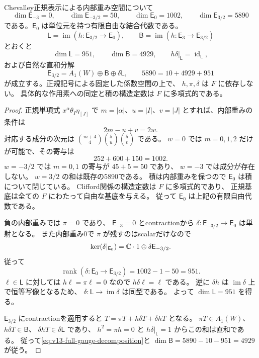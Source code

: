 \begin{lemma}
\label{lem:v13-gauge-weight-spaces}
Chevalley正規表示による内部重み空間について
\[
 \dim\mathsf E_{-3}=0,\qquad
 \dim\mathsf E_{-3/2}=50,\qquad
 \dim\mathsf E_0=1002,\qquad
 \dim\mathsf E_{3/2}=5890
\]
である。$\mathsf E_0$ は単位元を持つ有限自由な結合代数である。
\[
 \mathsf L=\operatorname{im}
       (h:\mathsf E_{3/2}\longrightarrow\mathsf E_0),\qquad
 \mathsf B=\operatorname{im}
       (h:\mathsf E_3\longrightarrow\mathsf E_{3/2})
\]
とおくと
\[
 \dim\mathsf L=951,\qquad \dim\mathsf B=4929,
 \qquad h\delta|_{\mathsf L}=\operatorname{id}_{\mathsf L},
\]
および自然な直和分解
\begin{equation}\label{eq:v13-full-gauge-decomposition}
 \mathsf E_{3/2}
 =A_1(W)\oplus\mathsf B\oplus\delta\mathsf L,
 \qquad 5890=10+4929+951
\end{equation}
が成立する。正規記号による固定した係数空間の上で、
$h,\pi,\delta$ は $F$ に依存しない。
具体的な作用素への同定と積の構造定数は $F$ に多項式的である。
\end{lemma}
\begin{proof}
正規単項式 $x^\alpha\theta_I\eta_{[J]}$ で
$m=|\alpha|$、$u=|I|$、$v=|J|$ とすれば、内部重みの条件は
\[
 2m-u+v=2w.
\]
対応する成分の次元は
$\binom{m+4}{4}\binom5u\binom5v$ である。
$w=0$ では $m=0,1,2$ だけが可能で、その寄与は
\[
 252+600+150=1002.
\]
$w=-3/2$ では $m=0,1$ の寄与が $45+5=50$ であり、
$w=-3$ では成分が存在しない。
$w=3/2$ の和は既存の5890である。
積は内部重みを保つので $\mathsf E_0$ は積について閉じている。
Clifford関係の構造定数は $F$ に多項式的であり、
正規基底は全ての $F$ にわたって自由な基底を与える。
従って $\mathsf E_0$ は上記の有限自由代数である。

負の内部重みでは $\pi=0$ であり、
$\mathsf E_{-3}=0$ とcontractionから
$\delta:\mathsf E_{-3/2}\to\mathsf E_0$ は単射となる。
また内部重み0で $\pi$ が残すのはscalarだけなので
\[
 \ker(\delta|_{\mathsf E_0})
 =\mathbb C\cdot1\oplus\delta\mathsf E_{-3/2}.
\]
従って
\[
 \operatorname{rank}(\delta:\mathsf E_0\to\mathsf E_{3/2})
 =1002-1-50=951.
\]
$\ell\in\mathsf L$ に対しては $h\ell=\pi\ell=0$ なので
$h\delta\ell=\ell$ である。
逆に $\delta h$ は $\operatorname{im}\delta$ 上で恒等写像となるため、
$\delta:\mathsf L\to\operatorname{im}\delta$ は同型である。
よって $\dim\mathsf L=951$ を得る。

$\mathsf E_{3/2}$ にcontractionを適用すると
$T=\pi T+h\delta T+\delta hT$ となる。
$\pi T\in A_1(W)$、$h\delta T\in\mathsf B$、
$\delta hT\in\delta\mathsf L$ であり、
$h^2=\pi h=0$ と $h\delta|_{\mathsf L}=1$ からこの和は直和である。
従って\eqref{eq:v13-full-gauge-decomposition}と
$\dim\mathsf B=5890-10-951=4929$ が従う。
\end{proof}


